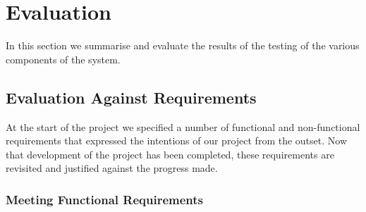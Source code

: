 \chapter{Evaluation}
\label{evaluation}

In this section we summarise and evaluate the results of the testing of the various components of the system.

\section{Evaluation Against Requirements}

At the start of the project we specified a number of functional and non-functional requirements that expressed the intentions of our project from the outset. Now that development of the project has been completed, these requirements are revisited and justified against the progress made.

\subsection{Meeting Functional Requirements}
\label{eval:functional}

